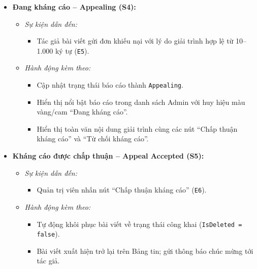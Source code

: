 \documentclass[11pt,a4paper]{article}
\begin{document}
\begin{itemize}[leftmargin=1.2cm, noitemsep]
    \item[\textbf{--}] \textbf{Đang kháng cáo -- Appealing (S4):}
    \begin{itemize}[leftmargin=0.8cm, label=--, noitemsep]
        \item \textit{Sự kiện dẫn đến:}
        \begin{itemize}[leftmargin=0.6cm, label=$\ast$, noitemsep]
            \item Tác giả bài viết gửi đơn khiếu nại với lý do giải trình hợp lệ từ 10--1.000 ký tự (\texttt{E5}).
        \end{itemize}
        \item \textit{Hành động kèm theo:}
        \begin{itemize}[leftmargin=0.6cm, label=$\ast$, noitemsep]
            \item Cập nhật trạng thái báo cáo thành \texttt{Appealing}.
            \item Hiển thị nổi bật báo cáo trong danh sách Admin với huy hiệu màu vàng/cam ``Đang kháng cáo''.
            \item Hiển thị toàn văn nội dung giải trình cùng các nút ``Chấp thuận kháng cáo'' và ``Từ chối kháng cáo''.
        \end{itemize}
    \end{itemize}

    \item[\textbf{--}] \textbf{Kháng cáo được chấp thuận -- Appeal Accepted (S5):}
    \begin{itemize}[leftmargin=0.8cm, label=--, noitemsep]
        \item \textit{Sự kiện dẫn đến:}
        \begin{itemize}[leftmargin=0.6cm, label=$\ast$, noitemsep]
            \item Quản trị viên nhấn nút ``Chấp thuận kháng cáo'' (\texttt{E6}).
        \end{itemize}
        \item \textit{Hành động kèm theo:}
        \begin{itemize}[leftmargin=0.6cm, label=$\ast$, noitemsep]
            \item Tự động khôi phục bài viết về trạng thái công khai (\texttt{IsDeleted = false}).
            \item Bài viết xuất hiện trở lại trên Bảng tin; gửi thông báo chúc mừng tới tác giả.
        \end{itemize}
    \end{itemize}


\end{itemize}
\end{document}
